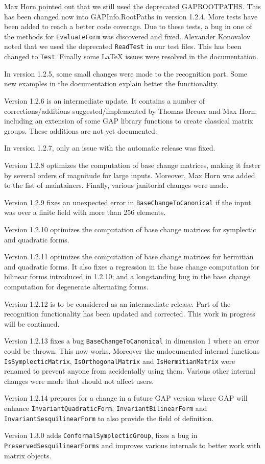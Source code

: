 \documentclass[a4paper,11pt]{report}
\begin{document}
{{Max Horn pointed out that we still used the deprecated
GAP{\textunderscore}ROOT{\textunderscore}PATHS. This has been changed now into
GAPInfo.RootPaths in version 1.2.4. More tests have been added to reach a
better code coverage. Due to these tests, a bug in one of the methods for \texttt{EvaluateForm} was discovered and fixed. Alexander Konovalov noted that we used the
deprecated \texttt{ReadTest} in our test files. This has been changed to \texttt{Test}. Finally some LaTeX issues were resolved in the documentation. 

In version 1.2.5, some small changes were made to the recognition part. Some
new examples in the documentation explain better the functionality. 

Version 1.2.6 is an intermediate update. It contains a number of
corrections/additions suggested/implemented by Thomas Breuer and Max Horn,
including an extension of some GAP library functions to create classical
matrix groups. These additions are not yet documented. 

In version 1.2.7, only an issue with the automatic release was fixed. 

Version 1.2.8 optimizes the computation of base change matrices, making it
faster by several orders of magnitude for large inputs. Moreover, Max Horn was
added to the list of maintainers. Finally, various janitorial changes were
made. 

Version 1.2.9 fixes an unexpected error in \texttt{BaseChangeToCanonical} if the input was over a finite field with more than 256 elements. 

Version 1.2.10 optimizes the computation of base change matrices for
symplectic and quadratic forms. 

Version 1.2.11 optimizes the computation of base change matrices for hermitian
and quadratic forms. It also fixes a regression in the base change computation
for bilinear forms introduced in 1.2.10; and a
long\texttt{}standing bug in the base change computation for
degenerate alternating forms. 

Version 1.2.12 is to be considered as an intermediate release. Part of the
recognition functionality has been updated and corrected. This work in
progress will be continued. 

Version 1.2.13 fixes a bug \texttt{BaseChangeToCanonical} in dimension 1 where an error could be thrown. This now works. Moreover the
undocumented internal functions \texttt{IsSymplecticMatrix}, \texttt{IsOrthogonalMatrix} and \texttt{IsHermitianMatrix} were renamed to prevent anyone from accidentally using them. Various other
internal changes were made that should not affect users. 

Version 1.2.14 prepares for a change in a future GAP version where GAP will
enhance \texttt{InvariantQuadraticForm}, \texttt{InvariantBilinearForm} and \texttt{InvariantSesquilinearForm} to also provide the field of definition. 

Version 1.3.0 adds \texttt{ConformalSymplecticGroup}, fixes a bug in \texttt{PreservedSesquilinearForms} and improves various internals to better work with matrix objects. }

  }
\end{document}
